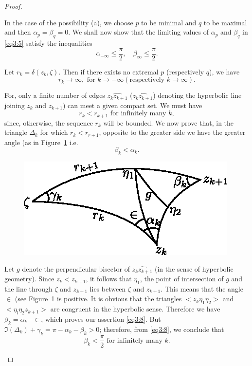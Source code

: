 \begin{proof}
\begin{enumerate}
In the case of the possibility (a), we choose $p$ to be minimal and $q$
to \pageoriginale be maximal and then $\alpha_p = \beta_q =0$. We
shall now show that the limiting values of $\alpha_p$ and $\beta_q$ in
\eqref{eq3:5} satisfy the inequalities 
\begin{equation*}
\alpha_{-\infty} \leq \frac{\pi}{2}, \quad \beta_{\infty} \leq
\frac{\pi}{2}. \tag{6}\label{eq3:6}
\end{equation*}

Let $r_k = \delta (z_k, \zeta)$. Then if there exists no extremal $p$
(respectively $q$), we have 
$$
r_k \to \infty, \text{ for } k \to -\infty (\text{respectively } k \to
\infty).
$$

For, only a finite number of edges $\widehat{z_kz_{k+1}}$
($\widehat{z_kz_{k+1}}$) denoting the hyperbolic line joining $z_k$ and
$z_{k+1}$) can meet a given compact set. We must have 
\begin{equation*}
r_k < r_{k+1} \text{ for infinitely many $k$}, \tag{7}\label{eq3:7}
\end{equation*}
since, otherwise, the sequence $r_k$ will be bounded. We now prove
that, in the triangle $\Delta_k$ for which $r_k < r_{r+1}$, opposite
to the greater side we have the greater angle (as in Figure~\ref{chap1:fig6} i.e.
\begin{equation*}
\beta_k < \alpha_k. \tag{8}\label{eq3:8}
\end{equation*}

\begin{figure}[H]
\centering
\includegraphics{vol29-fig/fig29-6.eps}
\smallskip
\caption{}
\label{chap1:fig6}
\end{figure}

Let $g$ denote the perpendicular bisector of $\widehat{z_k z_{k+1}}$
(in the sense of hyperbolic geometry). Since $z_k < z_{k+1}$, it
follows that $\eta_1$, the point of intersection of $g$ and the line
through $\zeta$ and $z_{k+1}$ lies between $\zeta$ and \pageoriginale
$z_{k+1}$. This means that the angle $\in$ (see Figure~\ref{chap1:fig6} is
positive. It is obvious that the triangles $<z_k \eta_1 \eta_2>$ and
$<\eta_l \eta_2 z_{k+1}>$ are congruent in the hyperbolic
sense. Therefore we have $\beta_k = \alpha_k-\in$, which
proves our assertion \eqref{eq3:8}. But $\mathfrak{I}(\Delta_k) + \gamma_k = \pi
- \alpha_k -\beta_k >0$; therefore, from \eqref{eq3:8}, we conclude that 
\begin{equation*}
\beta_k <\frac{\pi}{2} \text{ for infinitely many } k. \tag{9}\label{eq3:9}
\end{equation*}


\end{enumerate}
\end{proof}
